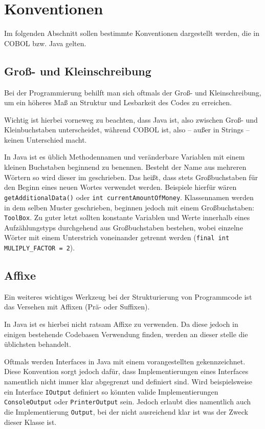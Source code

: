 \section{Konventionen}
Im folgenden Abschnitt sollen bestimmte Konventionen dargestellt werden, die in COBOL bzw. Java gelten.

\subsection{Groß- und Kleinschreibung}
Bei der Programmierung behilft man sich oftmals der Groß- und Kleinschreibung, um ein höheres Maß an Struktur und Lesbarkeit des Codes zu erreichen. 

Wichtig ist hierbei vorneweg zu beachten, dass Java  ist, also zwischen Groß- und Kleinbuchstaben unterscheidet, während COBOL  ist, also -- außer in Strings -- keinen Unterschied macht.

In Java ist es üblich Methodennamen und veränderbare Variablen mit einem kleinen Buchstaben beginnend zu benennen. Besteht der Name aus mehreren Wörtern so wird dieser im  geschrieben. Das heißt, dass stets Großbuchstaben für den Beginn eines neuen Wortes verwendet werden. Beispiele hierfür wären \texttt{getAdditionalData()} oder \texttt{int currentAmountOfMoney}. Klassennamen werden in dem selben Muster geschrieben, beginnen jedoch mit einem Großbuchstaben: \texttt{ToolBox}. Zu guter letzt sollten konstante Variablen und Werte innerhalb eines Aufzählungstyps durchgehend aus Großbuchstaben bestehen, wobei einzelne Wörter mit einem Unterstrich voneinander getrennt werden (\texttt{final int MULIPLY_FACTOR = 2}). 

\subsection{Affixe}
Ein weiteres wichtiges Werkzeug bei der Strukturierung von Programmcode ist das Versehen mit Affixen (Prä- oder Suffixen).

In Java ist es hierbei nicht ratsam Affixe zu verwenden. Da diese jedoch in einigen bestehende Codebasen Verwendung finden, werden an dieser stelle die üblichsten behandelt.

Oftmals werden Interfaces in Java mit einem vorangestellten  gekennzeichnet. Diese Konvention sorgt jedoch dafür, dass Implementierungen eines Interfaces namentlich nicht immer klar abgegrenzt und definiert sind. Wird beispielsweise ein Interface \texttt{IOutput} definiert so könnten valide Implementierungen \texttt{ConsoleOutput} oder \texttt{PrinterOutput} sein. Jedoch erlaubt dies namentlich auch die Implementierung \texttt{Output}, bei der nicht ausreichend klar ist was der Zweck dieser Klasse ist.

